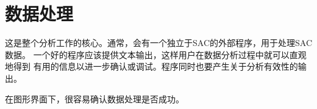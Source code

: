 \section{数据处理}
这是整个分析工作的核心。通常，会有一个独立于SAC的外部程序，用于处理SAC数据。
一个好的程序应该提供文本输出，这样用户在数据分析过程中就可以直观地得到
有用的信息以进一步确认或调试。程序同时也要产生关于分析有效性的输出。

在图形界面下，很容易确认数据处理是否成功。
